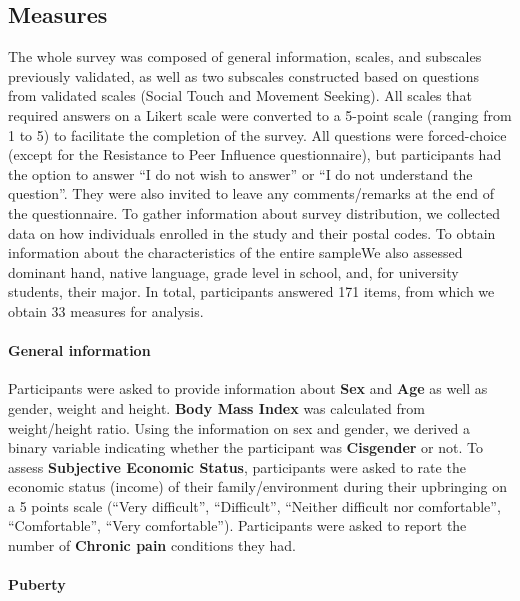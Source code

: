 \documentclass[preprint, 3p,
authoryear]{elsarticle} %
\begin{document}
\hypertarget{measures}{%
\subsection{Measures}\label{measures}}

The whole survey was composed of general information, scales, and
subscales previously validated, as well as two subscales constructed
based on questions from validated scales (Social Touch and Movement
Seeking). All scales that required answers on a Likert scale were
converted to a 5-point scale (ranging from 1 to 5) to facilitate the
completion of the survey. All questions were forced-choice (except for
the Resistance to Peer Influence questionnaire), but participants had
the option to answer ``I do not wish to answer'' or ``I do not
understand the question''. They were also invited to leave any
comments/remarks at the end of the questionnaire. To gather information
about survey distribution, we collected data on how individuals enrolled
in the study and their postal codes. To obtain information about the
characteristics of the entire sampleWe also assessed dominant hand,
native language, grade level in school, and, for university students,
their major. In total, participants answered 171 items, from which we
obtain 33 measures for analysis.

\hypertarget{general-information}{%
\paragraph{General information}\label{general-information}}

Participants were asked to provide information about \textbf{Sex} and
\textbf{Age} as well as gender, weight and height. \textbf{Body Mass
Index} was calculated from weight/height ratio. Using the information on
sex and gender, we derived a binary variable indicating whether the
participant was \textbf{Cisgender} or not. To assess \textbf{Subjective
Economic Status}, participants were asked to rate the economic status
(income) of their family/environment during their upbringing on a 5
points scale (``Very difficult'', ``Difficult'', ``Neither difficult nor
comfortable'', ``Comfortable'', ``Very comfortable''). Participants were
asked to report the number of \textbf{Chronic pain} conditions they had.

\hypertarget{puberty}{%
\paragraph{Puberty}\label{puberty}}
\end{document}
